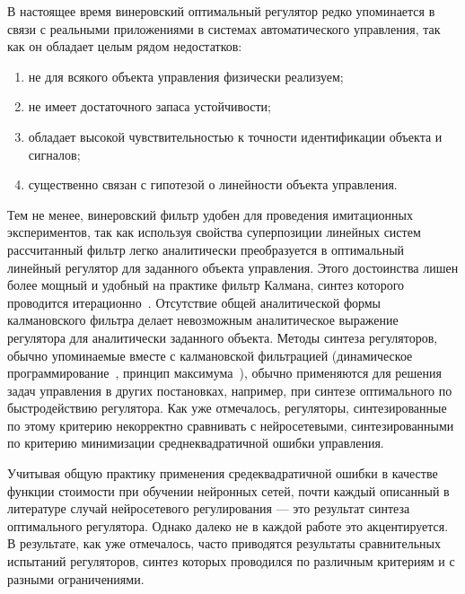 В настоящее время винеровский оптимальный регулятор редко упоминается
в связи с реальными приложениями в системах автоматического
управления, так как он обладает целым рядом недостатков:

\begin{enumerate}

\item
не для всякого объекта управления физически реализуем;

\item
не имеет достаточного запаса устойчивости;

\item
обладает высокой чувствительностью к точности идентификации объекта и
сигналов;

\item
существенно связан с гипотезой о линейности объекта управления.

\end{enumerate}

Тем не менее, винеровский фильтр удобен для проведения имитационных
экспериментов, так как используя свойства суперпозиции линейных систем
рассчитанный фильтр легко аналитически преобразуется в оптимальный
линейный регулятор для заданного объекта управления.  Этого
достоинства лишен более мощный и удобный на практике фильтр Калмана,
синтез которого проводится
итерационно~\cite{bramziff82,ostrem73}.  Отсутствие общей
аналитической формы калмановского фильтра делает невозможным
аналитическое выражение регулятора для аналитически заданного объекта.
Методы синтеза регуляторов, обычно упоминаемые вместе с калмановской
фильтрацией (динамическое программирование~\cite{brisynho72}, принцип
максимума~\cite{leondes70}), обычно применяются для решения задач
управления в других постановках, например, при синтезе оптимального по
быстродействию регулятора.  Как уже отмечалось, регуляторы,
синтезированные по этому критерию некорректно сравнивать с
нейросетевыми, синтезированными по критерию минимизации
среднеквадратичной ошибки управления.

Учитывая общую практику применения средеквадратичной ошибки в качестве
функции стоимости при обучении нейронных сетей, почти каждый описанный
в литературе случай нейросетевого регулирования --- это результат
синтеза оптимального регулятора.  Однако далеко не в каждой работе это
акцентируется.  В результате, как уже отмечалось, часто приводятся
результаты сравнительных испытаний регуляторов, синтез которых
проводился по различным критериям и с разными ограничениями.

